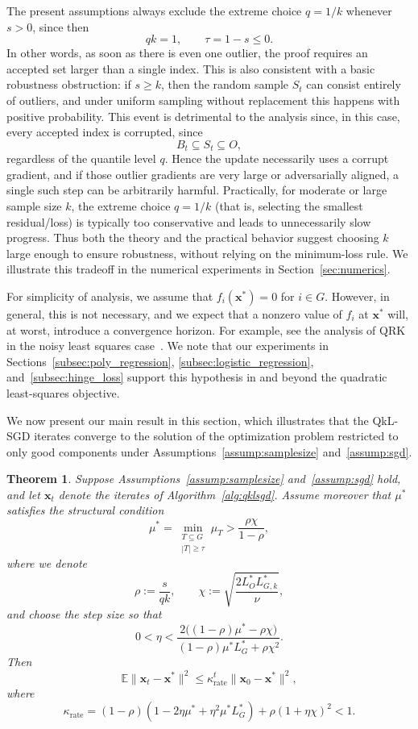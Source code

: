 \documentclass[11pt]{article}
\newcommand{\ve}[1]{\mathbf{#1}}
\newtheorem{thm}{Theorem}
\begin{document}
The present assumptions always exclude the extreme choice $q=1/k$ whenever $s>0$, since then
\[
{ qk  = 1},
\qquad
\tau = 1-s \le 0.
\]
In other words, as soon as there is even one outlier, the proof requires an accepted set larger than a single index. This is also consistent with a basic robustness obstruction: if $s\ge k$, then the random sample $S_t$ can consist entirely of outliers, and under uniform sampling without replacement this happens with positive probability.
This event is detrimental to the analysis since, in this case, every accepted index is corrupted,
since
\[
B_t\subseteq S_t\subseteq O,
\]
regardless of the quantile level $q$. Hence the update necessarily uses a corrupt gradient, and if those outlier gradients are very large or adversarially aligned, a single such step can be arbitrarily harmful. {Practically}, for moderate or large sample size $k$, the extreme choice $q=1/k$ (that is, selecting the smallest residual/loss) is typically too conservative and leads to unnecessarily slow progress. Thus both the theory and the practical behavior suggest choosing $k$ large enough to ensure robustness, without relying on the minimum-loss rule. We illustrate this tradeoff in the numerical experiments in Section~\ref{sec:numerics}.


{For simplicity of analysis, we assume that $f_i(\ve{x}^*)=0$ {for $i \in G$}. However, in general, this is not necessary, and we expect that a nonzero value of $f_i$ at $\ve{x}^*$ will, at worst, introduce a convergence horizon. For example, see the analysis of QRK in the noisy least squares case~\citep{battaglia2026quantile, CHPTimeVarying24}.} {We note that our experiments in Sections~\ref{subsec:poly_regression}, \ref{subsec:logistic_regression}, and~\ref{subsec:hinge_loss} support this hypothesis in and beyond the quadratic least-squares objective.}


{We now present our main result in this section, which illustrates that the QkL-SGD iterates converge to the solution of the optimization problem restricted to only good components under Assumptions~\ref{assump:samplesize} and~\ref{assump:sgd}.}

\begin{thm}\label{thm:main}
Suppose {Assumptions~\ref{assump:samplesize} and~\ref{assump:sgd}} hold, and let $\ve{x}_t$ denote the iterates
of Algorithm~\ref{alg:qklsgd}.
Assume moreover that $\mu^*$ satisfies the structural condition
\begin{equation}\label{eq:mu-star}
    \mu^* =
\min_{\substack{T\subseteq G\\ |T|\ge \tau}}\mu_T
>
\frac{\rho \chi}{ 1 - \rho},
\end{equation}
where we denote
\[
{\rho:=\frac{s}{ qk }},
\qquad
\chi:=
\sqrt{
\frac{2L_{O}^*L_{G,k}^*}{\nu}
},
\]
and choose the step size so that
\[
0<\eta<
\frac{
2\bigl((1-\rho)\mu^*-\rho \chi\bigr)
}{
(1-\rho)\mu^*L_{G}^*+\rho \chi^2
}.
\]
Then
\[
\mathbb{E}\|\ve{x}_{t}-\ve{x}^*\|^2
\le
\kappa^t_{\mathrm{rate}}\|\ve{x}_0-\ve{x}^*\|^2,
\]
where
\[
\kappa_{\mathrm{rate}}
=
(1-\rho)(1-2\eta\mu^*+\eta^2\mu^*L_{G}^*)+\rho (1+\eta \chi)^2<1.
\]
\end{thm}
\end{document}
